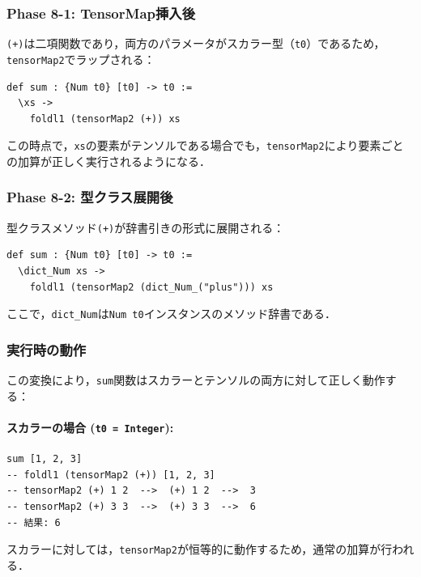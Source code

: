 \subsubsection{Phase 8-1: TensorMap挿入後}

\lstinline{(+)}は二項関数であり，両方のパラメータがスカラー型（\lstinline{t0}）であるため，\lstinline{tensorMap2}でラップされる：

\begin{lstlisting}[language=egison,numbers=none]
def sum : {Num t0} [t0] -> t0 :=
  \xs ->
    foldl1 (tensorMap2 (+)) xs
\end{lstlisting}

この時点で，\lstinline{xs}の要素がテンソルである場合でも，\lstinline{tensorMap2}により要素ごとの加算が正しく実行されるようになる．

\subsubsection{Phase 8-2: 型クラス展開後}

型クラスメソッド\lstinline{(+)}が辞書引きの形式に展開される：

\begin{lstlisting}[language=egison,numbers=none]
def sum : {Num t0} [t0] -> t0 :=
  \dict_Num xs ->
    foldl1 (tensorMap2 (dict_Num_("plus"))) xs
\end{lstlisting}

ここで，\lstinline{dict_Num}は\lstinline{Num t0}インスタンスのメソッド辞書である．

\subsubsection{実行時の動作}

この変換により，\lstinline{sum}関数はスカラーとテンソルの両方に対して正しく動作する：

\paragraph{スカラーの場合 (\lstinline{t0 = Integer}):}
\begin{lstlisting}[language=egison,numbers=none]
sum [1, 2, 3]
-- foldl1 (tensorMap2 (+)) [1, 2, 3]
-- tensorMap2 (+) 1 2  -->  (+) 1 2  -->  3
-- tensorMap2 (+) 3 3  -->  (+) 3 3  -->  6
-- 結果: 6
\end{lstlisting}

スカラーに対しては，\lstinline{tensorMap2}が恒等的に動作するため，通常の加算が行われる．

